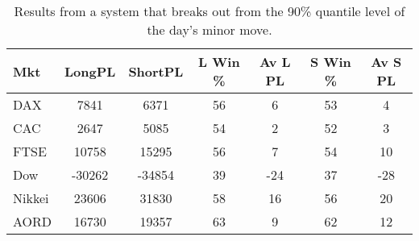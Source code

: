 \begin{table}[ht]
\centering
\caption[Results from a break out system using the day's the minor move]{Results from a system that breaks out from the 90\% quantile level of the day's minor move.} 
\label{tab:q_90_results}
\begin{tabular}{lcccccc}
  \toprule Mkt & LongPL & ShortPL & L Win \% & Av L PL & S Win \% & Av S PL \\ 
  \midrule DAX & 7841 & 6371 & 56 & 6 & 53 & 4 \\ 
  CAC & 2647 & 5085 & 54 & 2 & 52 & 3 \\ 
  FTSE & 10758 & 15295 & 56 & 7 & 54 & 10 \\ 
  Dow & -30262 & -34854 & 39 & -24 & 37 & -28 \\ 
  Nikkei & 23606 & 31830 & 58 & 16 & 56 & 20 \\ 
  AORD & 16730 & 19357 & 63 & 9 & 62 & 12 \\ 
   \bottomrule \end{tabular}
\end{table}
